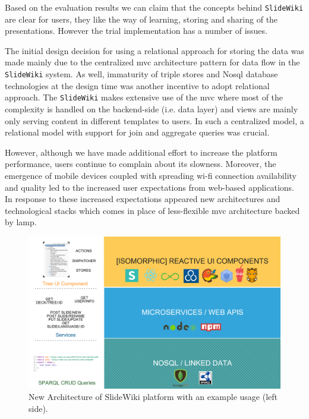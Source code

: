 \documentclass[PhD, Submit, ngerman,UKenglish,table]{scrbook}
\begin{document}
Based on the evaluation results we can claim that the concepts behind \texttt{SlideWiki} are clear for users, they like the way of learning, storing and sharing of the presentations.
However the trial implementation has a number of issues. 

The initial design decision for using a relational approach for storing the data was made mainly due to the centralized \gls{mvc} architecture pattern for data flow in the \texttt{SlideWiki} system. 
As well, immaturity of triple stores and No\gls{sql} database technologies at the design time was another incentive to adopt relational approach.
The \texttt{SlideWiki} makes extensive use of the \gls{mvc} where most of the complexity is handled on the backend-side (i.e. data layer) and views are mainly only serving content in different templates to users.
In such a centralized model, a relational model with support for join and aggregate queries was crucial.

However, although we have made additional effort to increase the platform performance, users continue to complain about its slowness.
Moreover, the emergence of mobile devices coupled with spreading wi-fi connection availability and quality led to the increased user expectations from web-based applications.
In response to these increased expectations appeared new architectures and technological stacks which comes in place of less-flexible \gls{mvc} architecture backed by \gls{lamp}. 

\begin{figure}[!ht]
\centering
\includegraphics[width=1\textwidth]{Images/SlideWiki2_architecture.png}
\caption{New Architecture of SlideWiki platform with an example usage (left side).}
\label{fig:SlideWiki2_architecture}
\end{figure}
\end{document}
